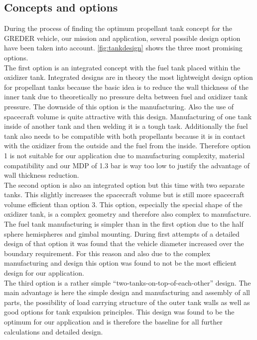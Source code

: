\subsection{Concepts and options}
During the process of finding the optimum propellant tank concept for the GREDER vehicle, our mission and application, several possible design option have been taken into account. \autoref{fig:tankdesign} shows the three most promising options.\\

The first option is an integrated concept with the fuel tank placed within the oxidizer tank. Integrated designs are in theory the most lightweight design option for propellant tanks because the basic idea is to reduce the wall thickness of the inner tank due to theoretically no pressure delta between fuel and oxidizer tank pressure. The downside of this option is the manufacturing. Also the use of spacecraft volume is quite attractive with this design. Manufacturing of one tank inside of another tank and then welding it is a tough task. Additionally the fuel tank also needs to be compatible with both propellants because it is in contact with the oxidizer from the outside and the fuel from the inside. Therefore option 1 is not suitable for our application due to manufacturing complexity, material compatibility and our MDP of 1.3 bar is way too low to justify the advantage of wall thickness reduction.\\

The second option is also an integrated option but this time with two separate tanks. This slightly increases the spacecraft volume but is still more spacecraft volume efficient than option 3. This option, especially the special shape of the oxidizer tank, is a complex geometry and therefore also complex to manufacture. The fuel tank manufacturing is simpler than in the first option due to the half sphere hemispheres and gimbal mounting. During first attempts of a detailed design of that option it was found that the vehicle diameter increased over the boundary requirement. For this reason and also due to the complex manufacturing and design this option was found to not be the most efficient design for our application.\\

The third option is a rather simple “two-tanks-on-top-of-each-other” design. The main advantage is here the simple design and manufacturing and assembly of all parts, the possibility of load carrying structure of the outer tank walls as well as good options for tank expulsion principles. This design was found to be the optimum for our application and is therefore the baseline for all further calculations and detailed design.

